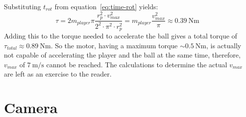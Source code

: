 Substituting $t_{rot}$ from equation~\ref{eq:time-rot} yields:
\begin{equation}
    \label{eq:torque5}
    \tau = 2m_{player}\pi\frac{r_p^2\cdot v_{max}^2}{2^{2} \cdot \pi^{2} \cdot r_p^2} = m_{player}\frac{v_{max}^2}{\pi} \approx \qty[per-mode=symbol]{0.39}{\N\m}
\end{equation}
Adding this to the torque needed to accelerate the ball gives a total torque of $\tau_{total} \approx \qty[per-mode=symbol]{0.89}{\N\m}$.
So the motor, having a maximum torque $\sim\qty[per-mode=symbol]{0.5}{\N\m}$, is actually not capable of accelerating the player and the ball at the same time, therefore, $v_{max}$ of $\qty[per-mode=symbol]{7}{\m\per\s}$ cannot be reached.
The calculations to determine the actual $v_{max}$ are left as an exercise to the reader.


\section{Camera}\label{sec:camera}

